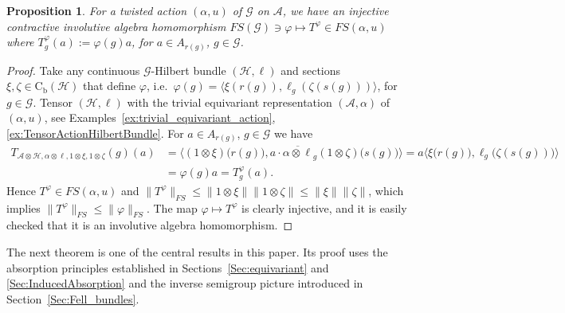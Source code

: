 \documentclass[11 pt, leqno]{amsart}
\numberwithin{equation}{section}
\theoremstyle{plain}
\newtheorem {prop}[thm] {Proposition}
\theoremstyle{definition}
\newcommand*{\contb}{\mathrm{C_b}}%
\renewcommand{\H}{\mathcal H}
\newcommand{\G}{\mathcal G} %
\newcommand{\A}{\mathcal A}
\begin{document}
\begin{prop}\label{prop:InclusionGroupoidFSAlg}
For a twisted action $(\alpha, u)$ of $\G$ on $\A$, we have an injective contractive involutive algebra homomorphism $FS(\G)\ni \varphi \mapsto T^\varphi\in FS(\alpha,u)$ where  $T^\varphi_g (a) := \varphi(g) a$, for $a \in A_{r(g)}$, $g\in \G$. 
\end{prop}
\begin{proof}
Take any continuous $\G$-Hilbert bundle $(\H,\ell)$ and sections $\xi ,\zeta \in \contb (\H)$ that define $\varphi$, i.e.\ $\varphi(g) = \langle \xi(r(g)) , \ell_g(\zeta(s(g))) \rangle$, for $g\in \G$. 
Tensor $(\H,\ell)$ with the trivial equivariant representation $(\A,\alpha)$ of $(\alpha,u)$, see Examples~\ref{ex:trivial_equivariant_action}, \ref{ex:TensorActionHilbertBundle}. 
For $a \in A_{r(g)}$, $g\in \G$ we have 
\[
\begin{split}
    T_{\A\otimes \H, \alpha \otimes \ell , 1 \otimes \xi , 1 \otimes \zeta}(g)(a) &= \langle (1 \otimes \xi) \big( r(g) \big) , a\cdot \overline{\alpha \otimes \ell}_g (1 \otimes \zeta) \big( s(g) \big) \rangle = a \langle \xi \big( r(g) ) ,  \ell_g \big( \zeta(s(g)) \big) \rangle \\
        &= \varphi(g) a = T^\varphi_g(a).
\end{split}
\]
Hence $T^\varphi \in FS(\alpha,u)$ and $\| T^\varphi \|_{FS} \leq \| 1 \otimes \xi \| \| 1 \otimes \zeta \| \leq \| \xi \| \| \zeta \|$, which implies $\| T^\varphi \|_{FS} \leq \| \varphi \|_{FS}$. 
The map $\varphi \mapsto T^\varphi$ is clearly injective, and it is easily checked that it is an involutive algebra homomorphism. 
\end{proof}

The next theorem is one of the central results in this paper. 
Its proof uses the absorption principles established in Sections~\ref{Sec:equivariant} and \ref{Sec:InducedAbsorption} and the inverse semigroup picture introduced in Section~\ref{Sec:Fell_bundles}.
\end{document}
